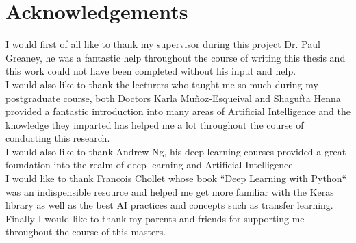 \chapter*{Acknowledgements}
I would first of all like to thank my supervisor during this project Dr. Paul Greaney, he was a fantastic help throughout the course of writing this thesis and this work could not have been completed without his input and help.
\\[1.5cm]
I would also like to thank the lecturers who taught me so much during my postgraduate course, both Doctors Karla Muñoz-Esqueival and Shagufta Henna provided a fantastic introduction into many areas of Artificial Intelligence and the knowledge they imparted has helped me a lot throughout the course of conducting this research. 
\\[1.5cm]
I would also like to thank Andrew Ng, his deep learning courses provided a great foundation into the realm of deep learning and Artificial Intelligence.
\\[1.5cm]
I would like to thank Francois Chollet whose book ``Deep Learning with Python`` was an indispensible resource and helped me get more familiar with the Keras library as well as the best AI practices and concepts such as transfer learning.
\\[1.5cm]
Finally I would like to thank my parents and friends for supporting me throughout the course of this masters.